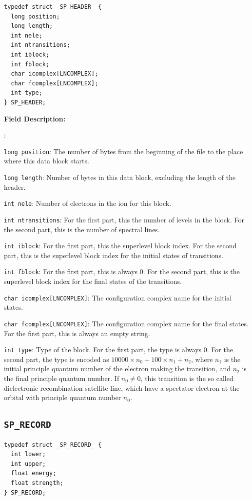\documentclass[twoside,letterpaper]{refrep}
\newenvironment{dbdesc}{\textbf{Field Description:} \begin{list}
	{:}{\setlength{\labelwidth}{2in}
	   \setlength{\leftmargin}{2in}
	   \setlength{\labelsep}{0.1in}
	   \setlength{\rightmargin}{0.2in}}}
	{\end{list}}
\begin{document}
\begin{verbatim}
typedef struct _SP_HEADER_ { 
  long position;
  long length;
  int nele;
  int ntransitions;
  int iblock;
  int fblock;
  char icomplex[LNCOMPLEX];
  char fcomplex[LNCOMPLEX];
  int type;
} SP_HEADER;
\end{verbatim}

\begin{dbdesc}
\item[\texttt{long position}:] The number of bytes from the beginning of the
file to the place where this data block starts.
\item[\texttt{long length}:] Number of bytes in this data block, excluding the
length of the header.
\item[\texttt{int nele}:] Number of electrons in the ion for this block.
\item[\texttt{int ntransitions}:] For the first part, this the number of
levels in the block. For the second part, this is the number of spectral lines.
\item[\texttt{int iblock}:] For the first part, this the superlevel block
index. For the second part, this is the superlevel block index for the initial
states of transitions.
\item[\texttt{int fblock}:] For the first part, this is always 0. For the
second part, this is the superlevel block index for the final states of the
transitions.
\item[\texttt{char icomplex[LNCOMPLEX]}:] The configuration complex name for
the initial states. 
\item[\texttt{char fcomplex[LNCOMPLEX]}:] The configuration complex name for
the final states. For the first part, this is always an empty string.
\item[\texttt{int type}:] Type of the block. For the first part, the type is
always 0. For the second part, the type is encoded as $10000\times n_0 +
100\times n_1 + n_2$, where $n_1$ is the initial principle quantum number of
the electron making the transition, and $n_2$ is the final principle quantum
number. If $n_0 \ne 0$, this transition is the so called dielectronic
recombination satellite line, which have a spectator electron at the orbital
with principle quantum number $n_0$.
\end{dbdesc}

\subsection{\texttt{SP\_RECORD}}
\begin{verbatim}
typedef struct _SP_RECORD_ {
  int lower;
  int upper;
  float energy;
  float strength;
} SP_RECORD;
\end{verbatim}
\end{document}
